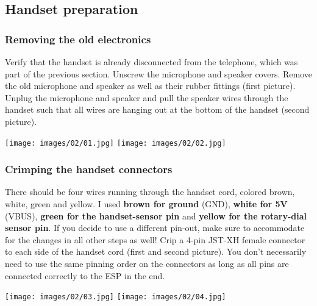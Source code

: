 \documentclass[]{article}
\begin{document}
\subsection{Handset preparation}

\subsubsection{Removing the old electronics}
\begin{minipage}[t]{0.4\linewidth}
	\vspace{0pt}
	Verify that the handset is already disconnected from the telephone, which was part of the previous section.
	\newline
	\newline
	Unscrew the microphone and speaker covers. Remove the old microphone and speaker as well as their rubber fittings (first picture).
	\newline
	\newline
	Unplug the microphone and speaker and pull the speaker wires through the handset such that all wires are hanging out at the bottom of the handset (second picture).
\end{minipage}
\hfill
\begin{minipage}[t]{0.5\linewidth}
	\vspace{0pt}
	\texttt{[image: images/02/01.jpg]}
	\texttt{[image: images/02/02.jpg]}
\end{minipage}

\subsubsection{Crimping the handset connectors}
\begin{minipage}[t]{0.4\linewidth}
	\vspace{0pt}
	There should be four wires running through the handset cord, colored brown, white, green and yellow.
	\newline
	\newline
	I used \textbf{brown for ground} (GND), \textbf{white for 5V} (VBUS), \textbf{green for the handset-sensor pin} and \textbf{yellow for the rotary-dial sensor pin}. If you decide to use a different pin-out, make sure to accommodate for the changes in all other steps as well!
	\newline
	\newline
	Crip a 4-pin JST-XH female connector to each side of the handset cord (first and second picture). You don't necessarily need to use the same pinning order on the connectors as long as all pins are connected correctly to the ESP in the end.
\end{minipage}
\hfill
\begin{minipage}[t]{0.5\linewidth}
	\vspace{0pt}
	\texttt{[image: images/02/03.jpg]}
	\texttt{[image: images/02/04.jpg]}
\end{minipage}
\end{document}
